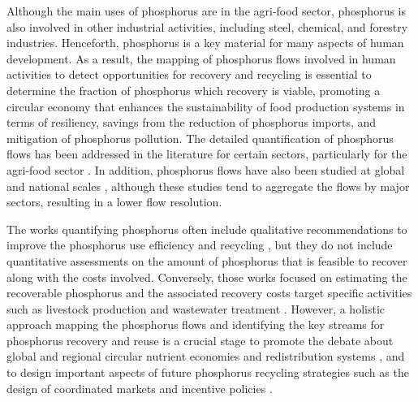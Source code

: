 \documentclass[]{elsarticle}
\begin{document}
Although the main uses of phosphorus are in the agri-food sector, phosphorus is also involved in other industrial activities, including steel, chemical, and forestry industries. Henceforth, phosphorus is a key material for many aspects of human development. As a result, the mapping of phosphorus flows involved in human activities to detect opportunities for recovery and recycling is essential 
to determine the fraction of phosphorus which recovery is viable, promoting a circular economy that
enhances the sustainability of food production systems in terms of resiliency, savings from the reduction of phosphorus imports, and  mitigation of phosphorus pollution.
The detailed quantification of phosphorus flows has been addressed in the literature for certain sectors, particularly for the agri-food sector \citep{boh2020nitrogen, zhou2021model, nesme2018global}. In addition, phosphorus flows have also been studied at global \citep{villalba2008global, chen2016half} and national scales \citep{van2016phosphorus, klinglmair2015phosphorus}, although these studies tend to
aggregate the flows by major sectors, resulting in a lower flow resolution. 

The works quantifying phosphorus often include qualitative recommendations to improve the phosphorus use efficiency and recycling \citep{van2016phosphorus, senthilkumar2012conceptual}, but they do not include quantitative assessments on the amount of phosphorus that is feasible to recover along with the costs involved. Conversely, those works focused on estimating the recoverable phosphorus and the associated recovery costs target specific activities such as livestock production \citep{martin2021geospatial, sampat2018technologies} and wastewater treatment \citep{egle_phosphorus_2016, nattorp2017cost}. However, a holistic approach mapping the phosphorus flows and identifying the key streams for phosphorus recovery and reuse is a crucial stage to promote the debate about global and regional circular nutrient economies and redistribution systems \citep{kahiluoto2021global}, and to design important aspects of future phosphorus recycling strategies such as the design of coordinated markets \citep{sampat2019coordinated} and incentive policies \citep{martin2022analysis}.

\end{document}
